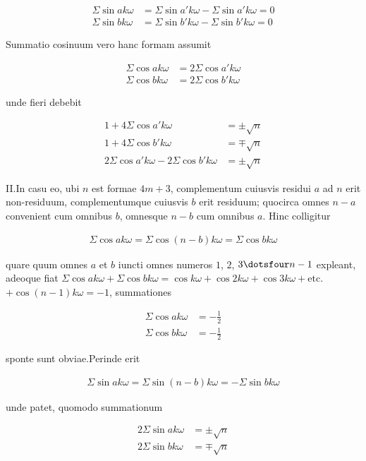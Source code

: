 \[
\begin{aligned}
\Sigma\sin ak\omega&=\Sigma\sin a'k\omega-\Sigma\sin a'k\omega=0\\
\Sigma\sin bk\omega&=\Sigma\sin b'k\omega-\Sigma\sin b'k\omega=0
\end{aligned}
\]

Summatio cosinuum vero hanc formam assumit

\[
\begin{aligned}
\Sigma\cos ak\omega&=2\Sigma\cos a'k\omega\\
\Sigma\cos bk\omega&=2\Sigma\cos b'k\omega
\end{aligned}
\]

unde fieri debebit

\[
\begin{aligned}
1+4\Sigma\cos a'k\omega&=\pm\surd n\\
1+4\Sigma\cos b'k\omega&=\mp\surd n\\
2\Sigma\cos a'k\omega-2\Sigma\cos b'k\omega&=\pm\surd n
\end{aligned}
\]

II.\quad In casu eo, ubi $n$ est formae $4m+3$, complementum cuiusvis residui $a$ ad $n$ erit non-residuum, complementumque cuiusvis $b$ erit residuum; quocirca omnes $n-a$ convenient cum omnibus $b$, omnesque $n-b$ cum omnibus $a$. Hinc colligitur

\[
\begin{aligned}
\Sigma\cos ak\omega=\Sigma\cos(n-b)k\omega=\Sigma\cos bk\omega
\end{aligned}
\]

quare quum omnes $a$ et $b$ iuncti omnes numeros $1$, $2$, $3\dotsfour n-1$ expleant, adeoque fiat $\Sigma\cos ak\omega+\Sigma\cos bk\omega=\cos k\omega+\cos2k\omega+\cos3k\omega+\text{etc.}$ $+\cos(n-1)k\omega=-1$, summationes

\[
\begin{aligned}
\Sigma\cos ak\omega&=-\tfrac12\\
\Sigma\cos bk\omega&=-\tfrac12
\end{aligned}
\]

sponte sunt obviae.\quad Perinde erit

\[
\begin{aligned}
\Sigma\sin ak\omega=\Sigma\sin(n-b)k\omega=-\Sigma\sin bk\omega
\end{aligned}
\]

unde patet, quomodo summationum

\[
\begin{aligned}
2\Sigma\sin ak\omega&=\pm\surd n\\
2\Sigma\sin bk\omega&=\mp\surd n
\end{aligned}
\]


